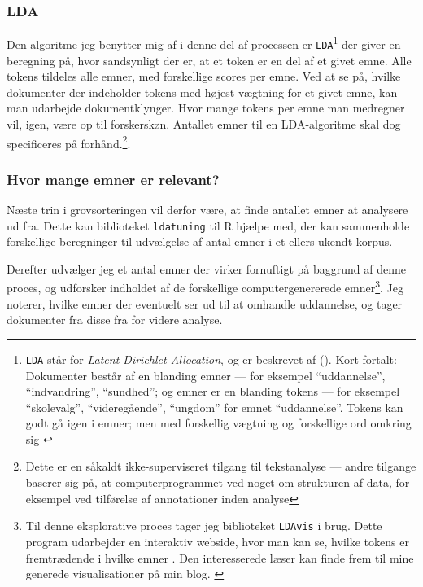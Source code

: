 \subsubsection{LDA}
Den algoritme jeg benytter mig af i denne del af processen er \texttt{LDA}\footnote{\texttt{LDA} står for \textit{Latent Dirichlet Allocation}, og er beskrevet af \citeauthor{bleiLatentDirichletAllocation2003} (\citeyear{bleiLatentDirichletAllocation2003}). Kort fortalt: Dokumenter består af en blanding emner --- for eksempel “uddannelse”, “indvandring”, “sundhed”; og emner er en blanding tokens --- for eksempel “skolevalg”, “videregående”, “ungdom” for emnet “uddannelse”. Tokens kan godt gå igen i emner; men med forskellig vægtning og forskellige ord omkring sig \autocite[s. 86]{silgeTextMiningTidy2017}
}
der giver en beregning på, hvor sandsynligt der er, at et token er en del af et givet emne.
Alle tokens tildeles alle emner, med forskellige scores per emne.
Ved at se på, hvilke dokumenter der indeholder tokens med højest vægtning for et givet emne, kan man udarbejde dokumentklynger.
Hvor mange tokens per emne man medregner vil, igen, være op til forskerskøn.
Antallet emner til en LDA-algoritme skal dog specificeres på forhånd.\footnote{Dette er en såkaldt ikke-superviseret tilgang til tekstanalyse --- andre tilgange baserer sig på, at computerprogrammet ved noget om strukturen af data, for eksempel ved tilførelse af annotationer inden analyse}.

\subsubsection{Hvor mange emner er relevant?}
Næste trin i grovsorteringen vil derfor være, at finde antallet emner at analysere ud fra. 
Dette kan biblioteket \texttt{ldatuning} til R hjælpe med, der kan sammenholde forskellige beregninger til udvælgelse af antal emner i et ellers ukendt korpus\autocite{nikitaSelectNumberTopics2016}.

Derefter udvælger jeg et antal emner der virker fornuftigt på baggrund af denne proces,
og udforsker indholdet af de forskellige computergenererede emner\footnote{
Til denne eksplorative proces tager jeg biblioteket \texttt{LDAvis} i brug.
Dette program udarbejder en interaktiv webside, hvor man kan se,
hvilke tokens er fremtrædende i hvilke emner \autocite{sievertCpsievertLDAvis2020}.
Den interesserede læser kan finde frem til mine generede visualisationer på min blog. \autocite{andersenSelectedAssignmentsAarhus2020}}.
Jeg noterer, hvilke emner der eventuelt ser ud til at omhandle uddannelse, og tager dokumenter fra disse fra for videre analyse.

